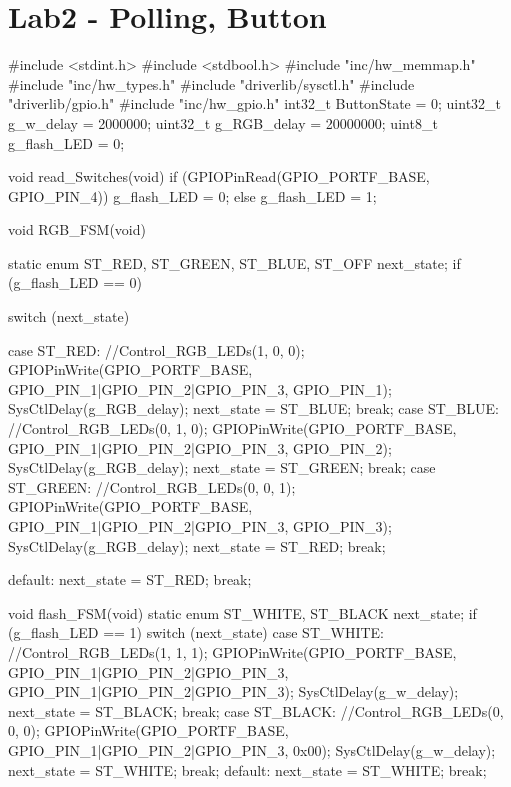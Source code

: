 \documentclass[12pt, a4paper]{article}
\begin{document}
\section{Lab2 - Polling, Button}
\begin{code}
#include <stdint.h>
#include <stdbool.h>
#include "inc/hw_memmap.h"
#include "inc/hw_types.h"
#include "driverlib/sysctl.h"
#include "driverlib/gpio.h"
#include "inc/hw_gpio.h"
int32_t ButtonState = 0;
uint32_t g_w_delay = 2000000;
uint32_t g_RGB_delay = 20000000;
uint8_t g_flash_LED = 0;

void read_Switches(void) {
    if (GPIOPinRead(GPIO_PORTF_BASE, GPIO_PIN_4)) {
        g_flash_LED = 0;
    } else {
        g_flash_LED = 1;
    }
}

void RGB_FSM(void) {
    static enum {ST_RED, ST_GREEN, ST_BLUE, ST_OFF} next_state;
    if (g_flash_LED == 0) {
        switch (next_state) {
            case ST_RED:
                //Control_RGB_LEDs(1, 0, 0);
                GPIOPinWrite(GPIO_PORTF_BASE, GPIO_PIN_1|GPIO_PIN_2|GPIO_PIN_3, GPIO_PIN_1);
                SysCtlDelay(g_RGB_delay);
                next_state = ST_BLUE;
                break;
            case ST_BLUE:
                //Control_RGB_LEDs(0, 1, 0);
                GPIOPinWrite(GPIO_PORTF_BASE, GPIO_PIN_1|GPIO_PIN_2|GPIO_PIN_3, GPIO_PIN_2);
                SysCtlDelay(g_RGB_delay);
                next_state = ST_GREEN;
                break;
            case ST_GREEN:
                //Control_RGB_LEDs(0, 0, 1);
                GPIOPinWrite(GPIO_PORTF_BASE, GPIO_PIN_1|GPIO_PIN_2|GPIO_PIN_3, GPIO_PIN_3);
                SysCtlDelay(g_RGB_delay);
                next_state = ST_RED;
                break;

            default:
                next_state = ST_RED;
                break;
        }
    }
}

void flash_FSM(void) {
    static enum {ST_WHITE, ST_BLACK} next_state;
    if (g_flash_LED == 1) {
        switch (next_state) {
            case ST_WHITE:
                //Control_RGB_LEDs(1, 1, 1);
                GPIOPinWrite(GPIO_PORTF_BASE, GPIO_PIN_1|GPIO_PIN_2|GPIO_PIN_3, GPIO_PIN_1|GPIO_PIN_2|GPIO_PIN_3);
                SysCtlDelay(g_w_delay);
                next_state = ST_BLACK;
                break;
            case ST_BLACK:
                //Control_RGB_LEDs(0, 0, 0);
                GPIOPinWrite(GPIO_PORTF_BASE, GPIO_PIN_1|GPIO_PIN_2|GPIO_PIN_3, 0x00);
                SysCtlDelay(g_w_delay);
                next_state = ST_WHITE;
                break;
            default:
                next_state = ST_WHITE;
                break;
        }
    }
}


\end{code}
\end{document}
